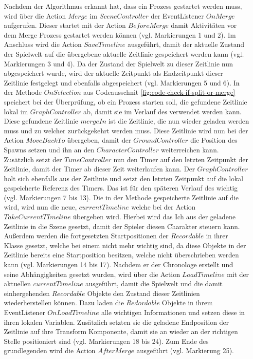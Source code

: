 Nachdem der Algorithmus erkannt hat, dass ein  Prozess gestartet werden muss, wird über die Action $Merge$ im $SceneController$ der EventListener $OnMerge$ aufgerufen. Dieser startet mit der Action $BeforeMerge$ damit Aktivitäten vor dem Merge Prozess gestartet werden können (vgl. Markierungen 1 und 2). Im Anschluss wird die Action $SaveTimeline$ ausgeführt, damit der aktuelle Zustand der Spielwelt auf die übergebene aktuelle Zeitlinie gespeichert werden kann (vgl. Markierungen 3 und 4). Da der Zustand der Spielwelt zu dieser Zeitlinie nun abgespeichert wurde, wird der aktuelle Zeitpunkt als Endzeitpunkt dieser Zeitlinie festgelegt und ebenfalls abgespeichert (vgl. Markierungen 5 und 6). In der Methode $OnSelection$ aus Codeausschnit \ref{fig:code-check-if-split-or-merge} speichert bei der Überprüfung, ob ein  Prozess starten soll, die gefundene Zeitlinie lokal im $GraphController$ ab, damit sie im Verlauf des  verwendet werden kann. Diese gefundene Zeitlinie $mergeIn$ ist die Zeitlinie, die nun wieder geladen werden muss und zu welcher zurückgekehrt werden muss. Diese Zeitlinie wird nun bei der Action $MoveBackTo$ übergeben, damit der $GroundController$ die Position des Spawns setzen und ihn an den $CharacterController$ weiterreichen kann. Zusätzlich setzt der $TimeController$ nun den Timer auf den letzten Zeitpunkt der Zeitlinie, damit der Timer ab dieser Zeit weiterlaufen kann. Der $GraphController$ holt sich ebenfalls aus der Zeitlinie und setzt den letzten Zeitpunkt auf die lokal gespeicherte Referenz des Timers. Das ist für den späteren Verlauf des  wichtig (vgl. Markierungen 7 bis 13). Die in der Methode gespeicherte Zeitlinie auf die  wird, wird nun die neue, $currentTimeline$ welche bei der Action $TakeCurrentTImeline$ übergeben wird. Hierbei wird das Ich aus der geladene Zeitlinie in die Szene gesetzt, damit der Spieler diesen Charakter steuern kann. Außerdem werden die fortgesetzten Startpositionen der $Recordable$ in ihrer Klasse gesetzt, welche bei einem  nicht mehr wichtig sind, da diese Objekte in der Zeitlinie bereits eine Startposition besitzen, welche nicht überschrieben werden kann (vgl. Markierungen 14 bis 17). Nachdem er der Chronologe erstellt und seine Abhängigkeiten gesetzt wurden, wird über die Action $LoadTimeline$ mit der aktuellen $currentTimeline$ ausgeführt, damit die Spielwelt und die damit einhergehenden $Recordable$ Objekte den Zustand dieser Zeitlinien wiederherstellen können. Dazu laden die $Redordable$ Objekte in ihrem EventListener $OnLoadTimeline$ alle wichtigen Informationen und setzen diese in ihren lokalen Variablen. Zusätzlich setzten sie die geladene Endposition der Zeitlinie auf ihre Transform Komponente, damit sie an wieder an der richtigen Stelle positioniert sind (vgl. Markierungen 18 bis 24). Zum Ende des grundlegenden  wird die Action $AfterMerge$ ausgeführt (vgl. Markierung 25).

